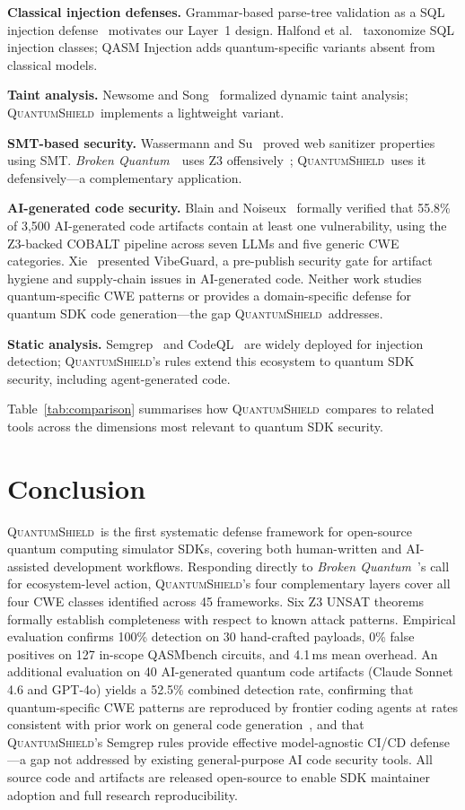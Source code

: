 \documentclass[conference,compsoc]{IEEEtran}
\newcommand{\tool}{\textsc{QuantumShield}}
\newcommand{\broken}{\textit{Broken Quantum}~\cite{blain2026broken}}
\begin{document}
\noindent
\textbf{Classical injection defenses.}
Grammar-based parse-tree validation as a SQL injection
defense~\cite{buehrer2005using} motivates our Layer~1 design.
Halfond et al.~\cite{halfond2006classification} taxonomize SQL
injection classes; QASM Injection adds quantum-specific variants
absent from classical models.

\noindent
\textbf{Taint analysis.}
Newsome and Song~\cite{newsome2005dynamic} formalized dynamic taint
analysis; \tool\ implements a lightweight variant.

\noindent
\textbf{SMT-based security.}
Wassermann and Su~\cite{wassermann2007sound} proved web sanitizer
properties using SMT.
\broken\ uses Z3 offensively~\cite{blain2026broken}; \tool\ uses
it defensively---a complementary application.

\noindent
\textbf{AI-generated code security.}
Blain and Noiseux~\cite{bbd2026} formally verified that 55.8\% of
3,500 AI-generated code artifacts contain at least one vulnerability,
using the Z3-backed COBALT pipeline across seven LLMs and five
generic CWE categories.
Xie~\cite{vibeguard2026} presented VibeGuard, a pre-publish security
gate for artifact hygiene and supply-chain issues in AI-generated code.
Neither work studies quantum-specific CWE patterns or provides a
domain-specific defense for quantum SDK code generation---the gap
\tool\ addresses.

\noindent
\textbf{Static analysis.}
Semgrep~\cite{semgrep2022} and CodeQL~\cite{avgustinov2016ql}
are widely deployed for injection detection; \tool's rules extend
this ecosystem to quantum SDK security, including agent-generated code.

Table~\ref{tab:comparison} summarises how \tool\ compares to related
tools across the dimensions most relevant to quantum SDK security.

\section{Conclusion}
\label{sec:conclusion}
\noindent\tool\ is the first systematic defense framework for open-source
quantum computing simulator SDKs, covering both human-written and
AI-assisted development workflows.
Responding directly to \broken's call for ecosystem-level action,
\tool's four complementary layers cover all four CWE classes identified
across 45 frameworks.
Six Z3 UNSAT theorems formally establish completeness with respect to
known attack patterns.
Empirical evaluation confirms 100\% detection on 30 hand-crafted
payloads, 0\% false positives on 127 in-scope QASMbench circuits,
and 4.1\,ms mean overhead.
An additional evaluation on 40 AI-generated quantum code artifacts
(Claude Sonnet 4.6 and GPT-4o) yields a 52.5\% combined detection rate,
confirming that quantum-specific CWE patterns are reproduced by frontier
coding agents at rates consistent with prior work on general code
generation~\cite{bbd2026}, and that \tool's Semgrep rules provide
effective model-agnostic CI/CD defense---a gap not addressed by
existing general-purpose AI code security tools.
All source code and artifacts are released open-source to enable SDK
maintainer adoption and full research reproducibility.
\end{document}
